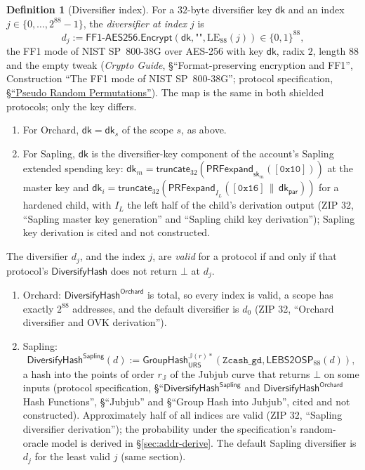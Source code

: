 \documentclass[11pt,a4paper]{article}
\theoremstyle{definition}
\newtheorem{definition}[theorem]{Definition}
\newcommand{\dk}{\ensuremath{\mathsf{dk}}}
\begin{document}
\begin{definition}[Diversifier index]\label{def:addr-index}
For a $32$-byte diversifier key $\dk$ and an index
$j \in \{0, \dots, 2^{88} - 1\}$, the \emph{diversifier at index $j$} is
\[
  d_j := \mathsf{FF1\text{-}AES256.Encrypt}(\dk, \texttt{""},
    \mathrm{LE}_{88}(j)) \in \{0,1\}^{88},
\]
the FF1 mode of NIST SP~800-38G over AES-256 with key $\dk$, radix $2$,
length $88$ and the empty tweak (\emph{Crypto Guide}, \S``Format-preserving
encryption and FF1'', Construction ``The FF1 mode of NIST SP~800-38G'';
protocol specification,
\href{https://zips.z.cash/protocol/protocol.pdf\#concreteprps}%
{\S``Pseudo Random Permutations''}). The map is the same in both shielded
protocols; only the key differs.
\begin{enumerate}
\item For Orchard, $\dk = \dk_s$ of the scope $s$, as above.
\item For Sapling, $\dk$ is the diversifier-key component of the account's
  Sapling extended spending key: $\dk_m = \mathsf{truncate}_{32}(
  \mathsf{PRFexpand}_{\mathsf{sk}_m}([\mathtt{0x10}]))$ at the master key
  and $\dk_i = \mathsf{truncate}_{32}(\mathsf{PRFexpand}_{I_L}(
  [\mathtt{0x16}] \,\|\, \dk_{\mathsf{par}}))$ for a hardened child, with
  $I_L$ the left half of the child's derivation output (ZIP 32, ``Sapling
  master key generation'' and ``Sapling child key derivation''); Sapling
  key derivation is cited and not constructed.
\end{enumerate}
The diversifier $d_j$, and the index $j$, are \emph{valid} for a protocol if
and only if that protocol's $\mathsf{DiversifyHash}$ does not return $\bot$
at $d_j$.
\begin{enumerate}[resume]
\item Orchard: $\mathsf{DiversifyHash}^{\mathsf{Orchard}}$ is total, so every
  index is valid, a scope has exactly $2^{88}$ addresses, and the default
  diversifier is $d_0$ (ZIP 32, ``Orchard diversifier and OVK
  derivation'').
\item Sapling:
  \[
    \mathsf{DiversifyHash}^{\mathsf{Sapling}}(d) :=
    \mathsf{GroupHash}^{\mathbb{J}(r)*}_{\mathsf{URS}}(\texttt{Zcash\_gd},
    \mathsf{LEBS2OSP}_{88}(d)),
  \]
  a hash into the points of order $r_{\mathbb{J}}$
  of the Jubjub curve that returns $\bot$ on some inputs (protocol
  specification, \S``$\mathsf{DiversifyHash}^{\mathsf{Sapling}}$ and
  $\mathsf{DiversifyHash}^{\mathsf{Orchard}}$ Hash Functions'',
  \S``Jubjub'' and \S``Group Hash into Jubjub'', cited and not
  constructed). Approximately half of all indices are valid (ZIP 32,
  ``Sapling diversifier derivation''); the probability under the
  specification's random-oracle model is derived in
  \S\ref{sec:addr-derive}.
  The default Sapling diversifier is $d_j$ for the least valid $j$ (same
  section).
\end{enumerate}
\end{definition}
\end{document}
